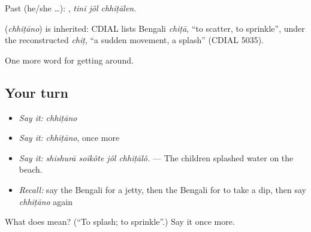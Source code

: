 Past (he/she …):   , \emph{tini jôl chhiṭālen}.

\begin{cousinweb}
\textbf{} (\emph{chhiṭāno}) is inherited: CDIAL lists Bengali \emph{chiṭā}, \textquotedblleft{}to scatter, to sprinkle\textquotedblright{}, under the reconstructed \emph{chiṭ}, \textquotedblleft{}a sudden movement, a splash\textquotedblright{} (CDIAL 5035).
\end{cousinweb}

\begin{grammarlens}[title={What you've built}]
One more word for getting around.
\end{grammarlens}

\subsection*{Your turn}
\begin{itemize}
\raggedright
  \item \emph{Say it:} \emph{chhiṭāno}
  \item \emph{Say it:} \emph{chhiṭāno}, once more
  \item \emph{Say it:} \emph{shishurā soikôte jôl chhiṭālô.} — The children splashed water on the beach.
  \item \emph{Recall:} say the Bengali for a jetty, then the Bengali for to take a dip, then say \emph{chhiṭāno} again
\end{itemize}

\begin{tcolorbox}[breakable,colback=teal!4,colframe=teal!35!black,title={Before you move on}]
What does  mean? (\textquotedblleft{}To splash; to sprinkle\textquotedblright{}.) Say it once more.
\end{tcolorbox}
